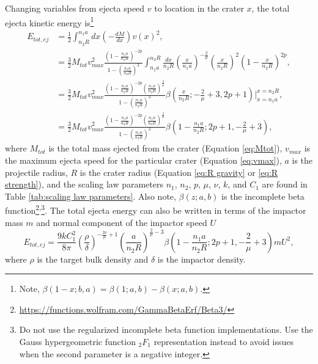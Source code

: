 \documentclass{article}
\begin{document}
Changing variables from ejecta speed $v$ to location in the crater $x$, the total ejecta kinetic energy is\footnote{Note, $\beta(1-x; b, a) = \beta(1; a, b) - \beta(x; a, b)$.}
\begin{align}
E_{tot,ej} &= \frac{1}{2}\int_{n_2 R}^{n_1 a}dx \left(-\frac{dM}{dx}\right)v(x)^2,\\\nonumber
&= \frac{3}{2}M_{tot}v_{max}^2\frac{\left(1-\frac{n_1 a}{n_2 R}\right)^{-2p}}{1-\left(\frac{n_1 a}{n_2 R}\right)^3}
\int_{n_1 a}^{n_2 R}
\frac{dx}{n_2 R}\left(\frac{x}{n_1 a}\right)^{-\frac{2}{\mu}}\left(\frac{x}{n_2 R}\right)^2\left(1-\frac{x}{n_2 R}\right)^{2p},\\\nonumber
& = \frac{3}{2}M_{tot}v_{max}^2\frac{\left(1-\frac{n_1 a}{n_2 R}\right)^{-2p}\left(\frac{n_1 a}{n_2 R}\right)^{\frac{2}{\mu}}}{1-\left(\frac{n_1 a}{n_2 R}\right)^3}
\beta\left(\frac{x}{n_2 R}; -\frac{2}{\mu}+3, 2p+1\right)\bigg\rvert^{x=n_2 R}_{x=n_1 a},\\
&=\frac{3}{2}M_{tot}v_{max}^2\frac{\left(1-\frac{n_1 a}{n_2 R}\right)^{-2p}\left(\frac{n_1 a}{n_2 R}\right)^{\frac{2}{\mu}}}{1-\left(\frac{n_1 a}{n_2 R}\right)^3}
\beta\left(1-\frac{n_1 a}{n_2 R}; 2p+1, -\frac{2}{\mu}+3\right),
\end{align}
where $M_{tot}$ is the total mass ejected from the crater (Equation \eqref{eq:Mtot}), $v_{max}$ is the maximum ejecta speed for the particular crater (Equation \eqref{eq:vmax}), $a$ is the projectile radius, $R$ is the crater radius (Equation \eqref{eq:R gravity} or \eqref{eq:R strength}), and the scaling law parameters $n_1$, $n_2$, $p$, $\mu$, $\nu$, $k$, and $C_1$ are found in Table \ref{tab:scaling law parameters}. Also note, $\beta(z; a, b)$ is the incomplete beta function\footnote{\href{https://functions.wolfram.com/GammaBetaErf/Beta3/}{https://functions.wolfram.com/GammaBetaErf/Beta3/}}\textsuperscript{,}\footnote{Do not use the regularized incomplete beta function implementations. Use the Gauss hypergeometric function $_2F_1$ representation instead to avoid issues when the second parameter is a negative integer.}.
The total ejecta energy can also be written in terms of the impactor mass $m$ and normal component of the impactor speed $U$ 
\begin{equation}\label{eq:Etotej}
E_{tot,ej} = \frac{9kC_1^2}{8\pi}\left(\frac{\rho}{\delta}\right)^{-\frac{2\nu}{\mu}+1}\left(\frac{a}{n_2 R}\right)^{\frac{2}{\mu}-3}
\beta\left(1-\frac{n_1 a}{n_2 R}; 2p+1, -\frac{2}{\mu}+3\right)
mU^2,
\end{equation}
where $\rho$ is the target bulk density and $\delta$ is the impactor density.
\end{document}
